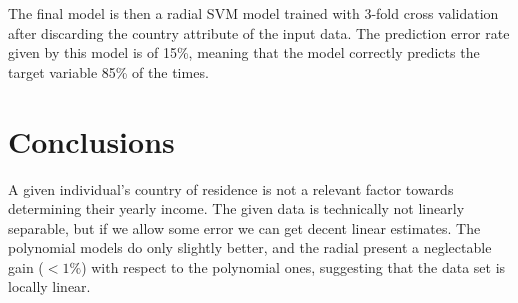 \documentclass[english]{scrartcl}
\begin{document}
The final model is then a radial SVM model trained with 3-fold cross validation after discarding the country attribute of the input data. The prediction error rate given by this model is of 15\%, meaning that the model correctly predicts the target variable 85\% of the times.

\section{Conclusions}

A given individual's country of residence is not a relevant factor towards determining their yearly income. The given data is technically not linearly separable, but if we allow some error we can get decent linear estimates. The polynomial models do only slightly better, and the radial present a neglectable gain ($<1\%$) with respect to the polynomial ones, suggesting that the data set is locally linear.
\end{document}
